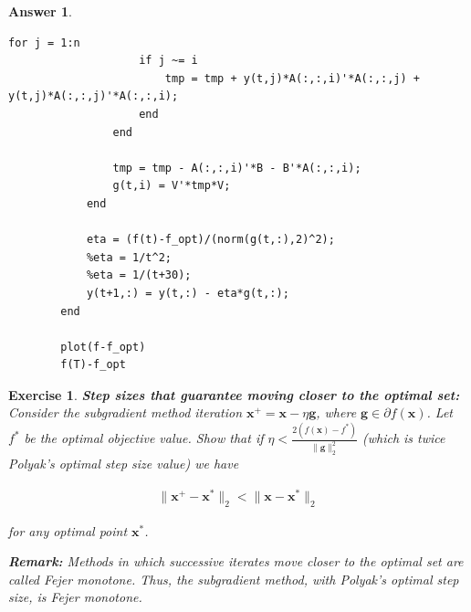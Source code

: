 \documentclass[12pt]{article}
\theoremstyle{colon}
\newtheorem{exercise}{Exercise}
\newtheorem*{answer}{Answer}
\begin{document}
\begin{answer}
\begin{enumerate}[label=\alph*)]
\begin{lstlisting}[style=Matlab-editor, basicstyle=\scriptsize]
                for j = 1:n
                    if j ~= i
                        tmp = tmp + y(t,j)*A(:,:,i)'*A(:,:,j) + y(t,j)*A(:,:,j)'*A(:,:,i);
                    end
                end
                
                tmp = tmp - A(:,:,i)'*B - B'*A(:,:,i);
                g(t,i) = V'*tmp*V;
            end
           
            eta = (f(t)-f_opt)/(norm(g(t,:),2)^2);
            %eta = 1/t^2;
            %eta = 1/(t+30);
            y(t+1,:) = y(t,:) - eta*g(t,:);
        end

        plot(f-f_opt)
        f(T)-f_opt
      \end{lstlisting}

  \end{enumerate}

\end{answer}

\clearpage

\begin{exercise}
  \textbf{Step sizes that guarantee moving closer to the optimal set:} Consider the subgradient method iteration $\bm{x}^+ = \bm{x} - \eta \bm{g}$, where $\bm{g} \in \partial f(\bm{x})$. Let $f^*$ be the optimal objective value. Show that if $\eta < \frac{2(f(\bm{x}) - f^*)}{\lVert \bm{g} \rVert_2^2}$ (which is twice Polyak's optimal step size value) we have

  \begin{gather*}
    \lVert \bm{x}^+ - \bm{x}^* \rVert_2 < \lVert \bm{x} - \bm{x}^* \rVert_2
  \end{gather*}

  \noindent for any optimal point $\bm{x}^*$.

  \textbf{Remark:} Methods in which successive iterates move closer to the optimal set are called \textit{Fejer monotone}. Thus, the subgradient method, with Polyak's optimal step size, is \textit{Fejer monotone}.

\end{exercise}
\end{document}
